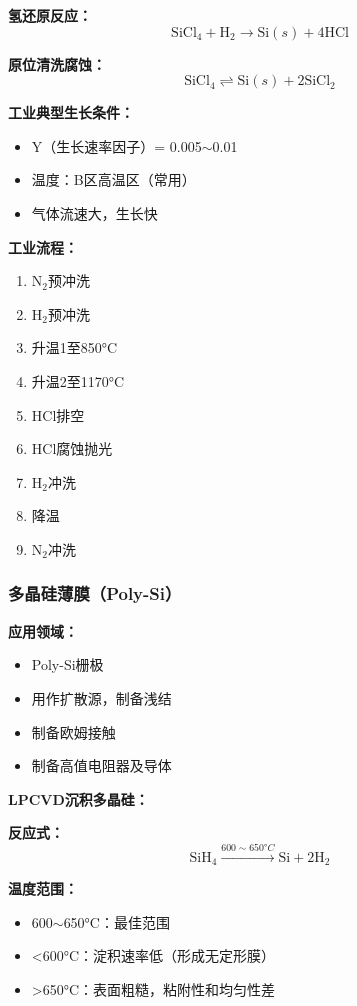 \documentclass[UTF8,12pt,a4paper]{ctexart}
\begin{document}
\textbf{氢还原反应：}
\begin{equation}
\text{SiCl}_4 + \text{H}_2 \rightarrow \text{Si}(s) + 4\text{HCl}
\end{equation}

\textbf{原位清洗腐蚀：}
\begin{equation}
\text{SiCl}_4 \rightleftharpoons \text{Si}(s) + 2\text{SiCl}_2
\end{equation}

\textbf{工业典型生长条件：}
\begin{itemize}
    \item Y（生长速率因子）= 0.005$\sim$0.01
    \item 温度：B区高温区（常用）
    \item 气体流速大，生长快
\end{itemize}

\textbf{工业流程：}
\begin{enumerate}
    \item N$_2$预冲洗
    \item H$_2$预冲洗
    \item 升温1至850°C
    \item 升温2至1170°C
    \item HCl排空
    \item HCl腐蚀抛光
    \item H$_2$冲洗
    \item 降温
    \item N$_2$冲洗
\end{enumerate}

\subsubsection{多晶硅薄膜（Poly-Si）}

\textbf{应用领域：}
\begin{itemize}
    \item Poly-Si栅极
    \item 用作扩散源，制备浅结
    \item 制备欧姆接触
    \item 制备高值电阻器及导体
\end{itemize}

\textbf{LPCVD沉积多晶硅：}

\textbf{反应式：}
\begin{equation}
\text{SiH}_4 \xrightarrow{600\sim650°C} \text{Si} + 2\text{H}_2
\end{equation}

\textbf{温度范围：}
\begin{itemize}
    \item 600$\sim$650°C：最佳范围
    \item <600°C：淀积速率低（形成无定形膜）
    \item >650°C：表面粗糙，粘附性和均匀性差
\end{itemize}
\end{document}
